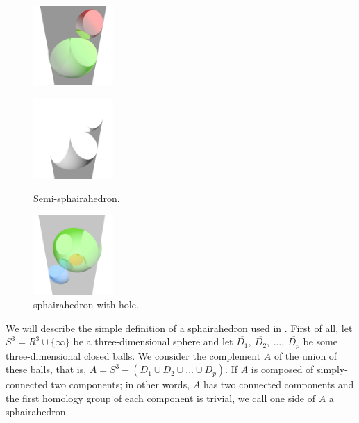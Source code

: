 \documentclass[dvipdfmx]{interact}
\theoremstyle{plain}%
\theoremstyle{definition}
\theoremstyle{remark}
\theoremstyle{problemstyle}
\begin{document}
\begin{figure}[h!tbp]
 \begin{minipage}[t]{0.6\textwidth}
  \begin{minipage}[t]{0.3\textwidth}
   \centering
   \includegraphics[width=1.2in, height=1.2in,
   keepaspectratio]{./img/sphairahedralPrism/semiSphairaAll.png}
   \label{fig:semi-sphairaAll}
  \end{minipage}
  \hspace*{\fill}
  \begin{minipage}[t]{0.3\textwidth}
   \centering
   \includegraphics[width=1.2in, height=1.2in,
   keepaspectratio]{./img/sphairahedralPrism/semiSphairaHalf.png}
   \label{fig:semi-sphairaHalf}
  \end{minipage}
  \hspace*{\fill}
  \caption{Semi-sphairahedron.}
  \label{fig:semi-sphairahedron}
 \end{minipage}
 \begin{minipage}[t]{0.3\textwidth}
  \centering
 \includegraphics[width=1.2in, height=1.2in,
 keepaspectratio]{./img/sphairahedralPrism/hole.png}
 \caption{sphairahedron with hole.}
  \label{fig:brokenHole}
 \end{minipage}
\end{figure}

We will describe the simple definition of a sphairahedron used in \cite{bridges2018}.
First of all, let $S^3 = R^3 \cup \{\infty\}$ be a three-dimensional sphere and let
$\overline{D_1},~\overline{D_2},~...,~\overline{D_p}$ be some
three-dimensional closed balls.
We consider the complement $A$ of the union of these balls, that is,
$A = S^3 - (\overline{D_1} \cup \overline{D_2} \cup ... \cup \overline{D_p})$.
If $A$ is composed of simply-connected two components;
in other words, $A$ has two connected components and the first homology
group of each component is trivial, we call one side of $A$
a sphairahedron.
\end{document}
